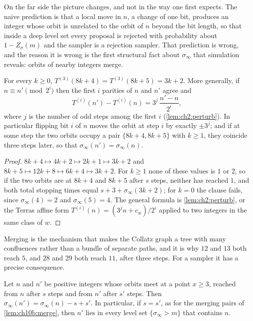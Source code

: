 On the far side the picture changes, and not in the way one first expects. The
naive prediction is that a local move in $n$, a change of one bit, produces an
integer whose orbit is unrelated to the orbit of $n$ beyond the bit length, so
that inside a deep level set every proposal is rejected with probability about
$1-Z_\sigma(m)$ and the sampler is a rejection sampler. That prediction is
wrong, and the reason it is wrong is the first structural fact about
$\sigma_\infty$ that simulation reveals: orbits of nearby integers merge.

\begin{lemma}[Merging]\label{lem:ch10b:merge}
For every $k\ge0$, $T^{(3)}(8k+4)=T^{(3)}(8k+5)=3k+2$. More generally, if
$n\equiv n'\pmod{2^i}$ then the first $i$ parities of $n$ and $n'$ agree and
\[
  T^{(i)}(n')-T^{(i)}(n)=3^{j}\,\frac{n'-n}{2^i},
\]
where $j$ is the number of odd steps among the first $i$ (\cref{lem:ch2:perturb}). In particular
flipping bit $i$ of $n$ moves the orbit at step $i$ by exactly $\pm3^j$; and if at some step the two orbits occupy a pair $\{8k+4,8k+5\}$ with $k\ge1$, they coincide three steps later, so that $\sigma_\infty(n')=\sigma_\infty(n)$.
\end{lemma}

\begin{proof}
$8k+4\mapsto4k+2\mapsto2k+1\mapsto3k+2$ and $8k+5\mapsto12k+8\mapsto6k+4\mapsto3k+2$.
For $k\ge1$ none of these values is $1$ or $2$, so if the two orbits are at $8k+4$ and $8k+5$ after $s$ steps, neither has reached $1$, and both total stopping times equal $s+3+\sigma_\infty(3k+2)$; for $k=0$ the clause fails, since $\sigma_\infty(4)=2$ and $\sigma_\infty(5)=4$.
The general formula is \cref{lem:ch2:perturb}, or the Terras affine form $T^{(i)}(n)=(3^jn+c_w)/2^i$
applied to two integers in the same class of $w$.
\end{proof}

Merging is the mechanism that makes the Collatz graph a tree with many
confluences rather than a bundle of separate paths, and it is why $12$ and $13$ both reach $5$, and $28$ and $29$ both reach $11$, after three steps. For a sampler it has
a precise consequence.

\begin{proposition}[Coalescence]\label{prop:ch10b:acceptance}
Let $n$ and $n'$ be positive integers whose orbits meet at a point $x\ge3$, reached from $n$ after $s$ steps and from $n'$ after $s'$ steps. Then $\sigma_\infty(n')=\sigma_\infty(n)-s+s'$. In particular, if $s=s'$, as for the merging pairs of \cref{lem:ch10b:merge}, then $n'$ lies in every level set $\{\sigma_\infty>m\}$ that contains $n$.
\end{proposition}


